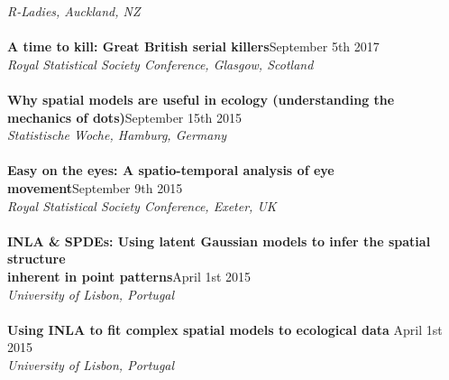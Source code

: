 \documentclass[10pt,letter]{article}
\begin{document}
                                     {\sl R-Ladies, Auckland, NZ}\\
                                     \hdashrule[0.5ex]{4cm}{1pt}{1pt}\\
                                     \textbf{A time to kill: Great British serial killers}\hfill  September 5th 2017\\
                                            {\sl Royal Statistical Society Conference, Glasgow, Scotland}\\
                                            \hdashrule[0.5ex]{4cm}{1pt}{1pt}\\
                                            \textbf{Why spatial models are useful in ecology (understanding the \\
                                              mechanics of dots)}\hfill September 15th 2015\\
                                                   {\sl Statistische Woche, Hamburg, Germany}\\
                                                   \hdashrule[0.5ex]{4cm}{1pt}{1pt}\\
                                                   \textbf{Easy on the eyes: A spatio-temporal analysis of eye movement}\hfill September 9th 2015\\
                                                          {\sl Royal Statistical Society Conference, Exeter, UK}\\
                                                          \hdashrule[0.5ex]{4cm}{1pt}{1pt}\\
                                                          \textbf{INLA \& SPDEs: 
                                                            Using latent Gaussian models to infer the spatial structure \\
                                                            inherent in point patterns}\hfill April 1st 2015\\
                                                                 {\sl University of Lisbon, Portugal}\\
                                                                 \hdashrule[0.5ex]{4cm}{1pt}{1pt}\\
                                                                 \textbf{Using INLA to fit complex spatial models to ecological data } \hfill April 1st 2015\\
                                                                        {\sl University of Lisbon, Portugal}\\
\newpage
\end{document}
